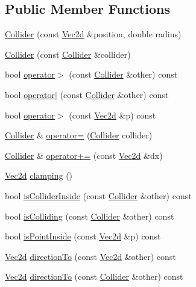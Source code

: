 \subsection*{Public Member Functions}
\begin{DoxyCompactItemize}
\item 
\hyperlink{class_collider_ad836873a098459ff45f7441e2a392965}{Collider} (const \hyperlink{class_vec2d}{Vec2d} \&position, double radius)
\item 
\hyperlink{class_collider_a558cb702fc3472adb0a0582c5fd086ee}{Collider} (const \hyperlink{class_collider}{Collider} \&collider)
\item 
bool \hyperlink{class_collider_abcff9ab2aed0f2c203a40992021cac5c}{operator$>$} (const \hyperlink{class_collider}{Collider} \&other) const 
\item 
bool \hyperlink{class_collider_afbb568e5d59403e71ab923a3434a1ace}{operator$\vert$} (const \hyperlink{class_collider}{Collider} \&other) const 
\item 
bool \hyperlink{class_collider_a6aa51611a7dba5cf61f6a244fdc595d3}{operator$>$} (const \hyperlink{class_vec2d}{Vec2d} \&p) const 
\item 
\hyperlink{class_collider}{Collider} \& \hyperlink{class_collider_ab00523233915a797a29cd1c1afaf902e}{operator=} (\hyperlink{class_collider}{Collider} collider)
\item 
\hyperlink{class_collider}{Collider} \& \hyperlink{class_collider_ab87384b560241dc5c311fe8445883146}{operator+=} (const \hyperlink{class_vec2d}{Vec2d} \&dx)
\item 
\hyperlink{class_vec2d}{Vec2d} \hyperlink{class_collider_ad7d4e7416f8656185187ce091636c415}{clamping} ()
\item 
bool \hyperlink{class_collider_a7c95964c0df6bdc17affb9c895529a78}{is\-Collider\-Inside} (const \hyperlink{class_collider}{Collider} \&other) const 
\item 
bool \hyperlink{class_collider_a9956c286daeba882bbf6bc8dd4b1b646}{is\-Colliding} (const \hyperlink{class_collider}{Collider} \&other) const 
\item 
bool \hyperlink{class_collider_aa2513b48f566bc1ef1870018a37e7e59}{is\-Point\-Inside} (const \hyperlink{class_vec2d}{Vec2d} \&p) const 
\item 
\hyperlink{class_vec2d}{Vec2d} \hyperlink{class_collider_a0c5fb5c53e890eed9de59cdc91bfd1a6}{direction\-To} (const \hyperlink{class_vec2d}{Vec2d} \&other) const 
\item 
\hyperlink{class_vec2d}{Vec2d} \hyperlink{class_collider_a23fb77a557f53fe080c492cb19fc2fe7}{direction\-To} (const \hyperlink{class_collider}{Collider} \&other) const 

\end{DoxyCompactItemize}
